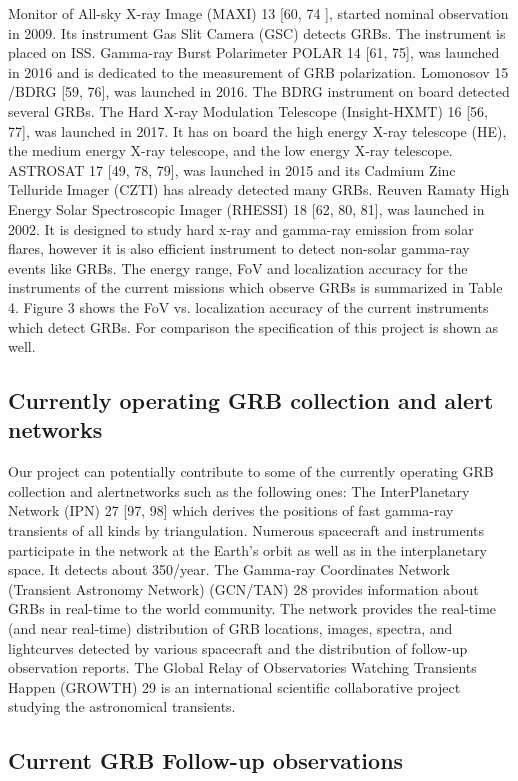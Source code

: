 \documentclass[12pt, a4paper,titlepage]{article}
\numberwithin{equation}{section}
\numberwithin{figure}{section}
\begin{document}
Monitor of All-sky X-ray Image (MAXI) 13 [60, 74 ], started nominal observation in 2009. Its instrument Gas Slit Camera (GSC) detects GRBs. The instrument is placed on ISS.
Gamma-ray Burst Polarimeter POLAR 14 [61, 75], was launched in 2016 and is dedicated to the measurement of GRB polarization.
Lomonosov 15 /BDRG [59, 76], was launched in 2016. The BDRG instrument on board detected several GRBs.
The Hard X-ray Modulation Telescope (Insight-HXMT) 16 [56, 77], was launched in 2017. It has on board the high energy X-ray telescope (HE), the medium energy X-ray telescope, and the low energy X-ray telescope.
ASTROSAT 17 [49, 78, 79], was launched in 2015 and its Cadmium Zinc Telluride Imager (CZTI) has already detected many GRBs.
Reuven Ramaty High Energy Solar Spectroscopic Imager (RHESSI) 18 [62, 80, 81], was launched in 2002. It is designed to study hard x-ray and gamma-ray emission from solar flares, however it is also efficient instrument to detect non-solar gamma-ray events like GRBs.
The energy range, FoV and localization accuracy for the instruments of the current missions which observe GRBs is summarized in Table 4. Figure 3 shows the FoV vs. localization accuracy of the current instruments which detect GRBs. For comparison the specification of this project is shown as
well.

\subsection{Currently operating GRB collection and alert networks}

Our project can potentially contribute to some of the currently operating GRB collection and alertnetworks such as the following ones:
The InterPlanetary Network (IPN) 27 [97, 98] which derives the positions of fast gamma-ray transients of all kinds by triangulation. Numerous spacecraft and instruments participate in the network at the Earth’s orbit as well as in the interplanetary space. It detects about 350/year.
The Gamma-ray Coordinates Network (Transient Astronomy Network) (GCN/TAN) 28 provides information about GRBs in real-time to the world community. The network provides the real-time (and near real-time) distribution of GRB locations, images, spectra, and lightcurves detected by various spacecraft and the distribution of follow-up observation reports.
The Global Relay of Observatories Watching Transients Happen (GROWTH) 29 is an international scientific collaborative project studying the astronomical transients.

\subsection{Current GRB Follow-up observations}
\end{document}
